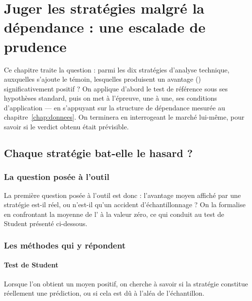 \chapter{Juger les stratégies malgré la dépendance : une escalade de prudence}
\label{chap:juger}

Ce chapitre traite la question : parmi les dix stratégies d'analyse
technique, auxquelles s'ajoute le témoin, lesquelles produisent un avantage
(\edgevar) significativement
positif ? On applique d'abord le test de référence sous ses hypothèses
standard, puis on met à l'épreuve, une à une, ses conditions
d'application — en s'appuyant sur la structure de dépendance mesurée au
chapitre~\ref{chap:donnees}. On terminera en interrogeant le marché
lui-même, pour savoir si le verdict obtenu était prévisible.

\section{Chaque stratégie bat-elle le hasard ?}
\label{sec:b1-etape1}

\subsection{La question posée à l'outil}

La première question posée à l'outil est donc : l'avantage moyen affiché
par une stratégie est-il réel, ou n'est-il qu'un accident
d'échantillonnage ? On la formalise en confrontant la moyenne de
l'\edgevar{} à la valeur zéro, ce qui conduit au test de Student présenté
ci-dessous.

\subsection{Les méthodes qui y répondent}

\subsubsection*{Test de Student}

Lorsque l'on obtient un \edgevar{} moyen positif, on cherche à savoir si la
stratégie constitue réellement une prédiction, ou si cela est dû à l'aléa
de l'échantillon.

